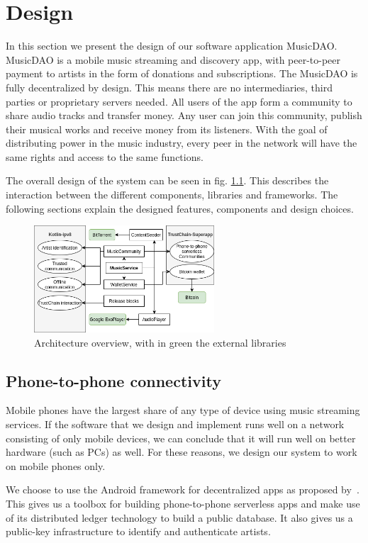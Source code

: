 \chapter{Design}
In this section we present the design of our software application MusicDAO. MusicDAO is a mobile music streaming and discovery app, with peer-to-peer payment to artists in the form of donations and subscriptions. The MusicDAO is fully decentralized by design. This means there are no intermediaries, third parties or proprietary servers needed. All users of the app form a community to share audio tracks and transfer money. Any user can join this community, publish their musical works and receive money from its listeners. With the goal of distributing power in the music industry, every peer in the network will have the same rights and access to the same functions.

The overall design of the system can be seen in fig. \ref{fig:architecture}. This describes the interaction between the different components, libraries and frameworks. The following sections explain the designed features, components and design choices.

\begin{figure}
    \includegraphics[width=0.6\textwidth]{design/architecture-v1.png}
    \caption{Architecture overview, with in green the external libraries}
    \label{fig:architecture}
\end{figure}

\section{Phone-to-phone connectivity}
Mobile phones have the largest share of any type of device using music streaming services. If the software that we design and implement runs well on a network consisting of only mobile devices, we can conclude that it will run well on better hardware (such as PCs) as well. For these reasons, we design our system to work on mobile phones only.

We choose to use the Android framework for decentralized apps as proposed by~\cite{mattskala2020}. This gives us a toolbox for building phone-to-phone serverless apps and make use of its distributed ledger technology to build a public database. It also gives us a public-key infrastructure to identify and authenticate artists. 

